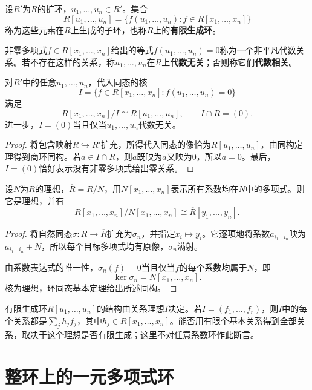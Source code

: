 \begin{definition}\label{p2:concept:c3-finitely-generated-ring}
设$R'$为$R$的扩环，$u_1,\ldots,u_n\in R'$。集合
\[
R[u_1,\ldots,u_n]
=\{f(u_1,\ldots,u_n):f\in R[x_1,\ldots,x_n]\}
\]
称为这些元素在$R$上生成的子环，也称$R$上的\textbf{有限生成环}。

非零多项式$f\in R[x_1,\ldots,x_n]$给出的等式$f(u_1,\ldots,u_n)=0$称为一个非平凡代数关系。若不存在这样的关系，称$u_1,\ldots,u_n$在$R$上\textbf{代数无关}；否则称它们\textbf{代数相关}。
\end{definition}

\begin{corollary}
对$R'$中的任意$u_1,\ldots,u_n$，代入同态的核
\[
I=\{f\in R[x_1,\ldots,x_n]:f(u_1,\ldots,u_n)=0\}
\]
满足
\[
R[x_1,\ldots,x_n]/I\cong R[u_1,\ldots,u_n],\qquad I\cap R=(0).
\]
进一步，$I=(0)$当且仅当$u_1,\ldots,u_n$代数无关。
\end{corollary}
\begin{proof}
将包含映射$R\hookrightarrow R'$扩充，所得代入同态的像恰为$R[u_1,\ldots,u_n]$，由同构定理得到商环同构。若$a\in I\cap R$，则$a$既映为$a$又映为$0$，所以$a=0$。最后，$I=(0)$恰好表示没有非零多项式给出零关系。
\end{proof}

\begin{proposition}
设$N$为$R$的理想，$\overline R=R/N$，用$N[x_1,\ldots,x_n]$表示所有系数均在$N$中的多项式。则它是理想，并有
\[
R[x_1,\ldots,x_n]/N[x_1,\ldots,x_n]
\cong\overline R[y_1,\ldots,y_n].
\]
\end{proposition}
\begin{proof}
将自然同态$\sigma:R\to\overline R$扩充为$\sigma_n$，并指定$x_i\mapsto y_i$。它逐项地将系数$a_{i_1\ldots i_n}$映为$a_{i_1\ldots i_n}+N$，所以每个目标多项式均有原像，$\sigma_n$满射。

由系数表达式的唯一性，$\sigma_n(f)=0$当且仅当$f$的每个系数均属于$N$，即
\[
\ker\sigma_n=N[x_1,\ldots,x_n].
\]
核为理想，环同态基本定理给出所述同构。
\end{proof}

有限生成环$R[u_1,\ldots,u_n]$的结构由关系理想$I$决定。若$I=(f_1,\ldots,f_r)$，则$I$中的每个关系都是$\sum_j h_jf_j$，其中$h_j\in R[x_1,\ldots,x_n]$。能否用有限个基本关系得到全部关系，取决于这个理想是否有限生成；这里不对任意系数环作此断言。


\section{整环上的一元多项式环}

